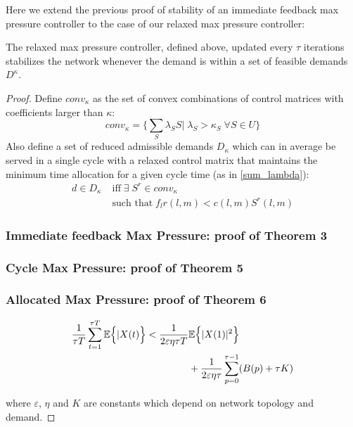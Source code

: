 Here we extend the previous proof of stability of an immediate feedback max pressure controller to the case of our relaxed max pressure controller: 

\begin{Thm}\label{stabRelaxMP}
The relaxed max pressure controller, defined above, updated every $\tau$ iterations stabilizes the network whenever the demand is within a set of feasible demands $D^{\kappa}$.
\end{Thm}

\begin{proof}

Define $conv_{\kappa}$ as the set of convex combinations of control matrices with coefficients larger than $\kappa$:
\begin{equation}
conv_{\kappa} = \Big\{ \sum_{S}\lambda_{S}S \big| \; \lambda_S > \kappa_S \; \forall S\in U\Big\}
\end{equation}
Also define a set of reduced admissible demands $D_{\kappa}$ which can in average be served in a single cycle with a relaxed control matrix that maintains the minimum time allocation for a given cycle time (as in \eqref{sum_lambda}):
\begin{align} \nonumber
d \in D_{\kappa} \; & \text{iff} \; \exists \; S^r \in conv_{\kappa} \; \\ & \text{such that} \; f_{l}r(l,m) < c(l,m)S^r(l,m)
\label{admissible_relaxed}
\end{align} 


\subsubsection*{Immediate feedback Max Pressure: proof of Theorem 3}

\subsubsection*{Cycle Max Pressure: proof of Theorem 5}

\subsubsection*{Allocated Max Pressure: proof of Theorem 6}



\begin{align} \label{CYCLE_BOUNDS}
\dfrac{1}{\tau T} \displaystyle\sum_{t=1}^{\tau T} \expectation{\vert X(t)}< \dfrac{1}{2\varepsilon\eta\tau T}& \expectation{\vert X(1) \vert^{2}} \\ \nonumber
& + \dfrac{1}{2\varepsilon\eta\tau}\displaystyle\sum_{p=0}^{\tau - 1} (B(p) + \tau K)
\end{align}

where $\varepsilon$, $\eta$ and $K$ are constants which depend on network topology and demand.

\end{proof}

